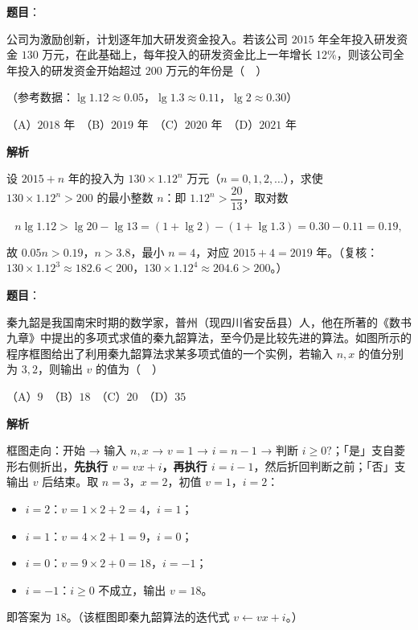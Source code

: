 \begin{answer}

\textbf{题目}：

公司为激励创新，计划逐年加大研发资金投入。若该公司 \(2015\) 年全年投入研发资金 \(130\) 万元，在此基础上，每年投入的研发资金比上一年增长 12\%，则该公司全年投入的研发资金开始超过 \(200\) 万元的年份是（　）

（参考数据：\(\lg 1.12\approx 0.05\)，\(\lg 1.3\approx 0.11\)，\(\lg 2\approx 0.30\)）

（A）\(2018\) 年　（B）\(2019\) 年　（C）\(2020\) 年　（D）\(2021\) 年

\textbf{解析}

设 \(2015+n\) 年的投入为 \(130\times1.12^{n}\) 万元（\(n=0,1,2,\dots\)），求使 \(130\times1.12^{n}>200\) 的最小整数 \(n\)：即 \(1.12^{n}>\dfrac{20}{13}\)，取对数

\nopagebreak[4]
\[
n\lg 1.12>\lg 20-\lg 13=(1+\lg 2)-(1+\lg 1.3)=0.30-0.11=0.19,
\]

故 \(0.05n>0.19\)，\(n>3.8\)，最小 \(n=4\)，对应 \(2015+4=2019\) 年。（复核：\(130\times1.12^{3}\approx182.6<200\)，\(130\times1.12^{4}\approx204.6>200\)。）


\end{answer}
\begin{answer}

\textbf{题目}：

秦九韶是我国南宋时期的数学家，普州（现四川省安岳县）人，他在所著的《数书九章》中提出的多项式求值的秦九韶算法，至今仍是比较先进的算法。如图所示的程序框图给出了利用秦九韶算法求某多项式值的一个实例，若输入 \(n,x\) 的值分别为 \(3,2\)，则输出 \(v\) 的值为（　）
\nopagebreak[4]
\begin{center}\end{center}
\nopagebreak[4]
（A）\(9\)　（B）\(18\)　（C）\(20\)　（D）\(35\)

\textbf{解析}

框图走向：开始 → 输入 \(n,x\) → \(v=1\) → \(i=n-1\) → 判断 \(i\geqslant0?\)；「是」支自菱形右侧折出，\textbf{先执行 \(v=vx+i\)，再执行 \(i=i-1\)}，然后折回判断之前；「否」支输出 \(v\) 后结束。取 \(n=3\)，\(x=2\)，初值 \(v=1\)，\(i=2\)：

\begin{itemize}
\item \(i=2\)：\(v=1\times2+2=4\)，\(i=1\)；
\item \(i=1\)：\(v=4\times2+1=9\)，\(i=0\)；
\item \(i=0\)：\(v=9\times2+0=18\)，\(i=-1\)；
\item \(i=-1\)：\(i\geqslant0\) 不成立，输出 \(v=18\)。
\end{itemize}

即答案为 \(18\)。（该框图即秦九韶算法的迭代式 \(v\leftarrow vx+i\)。）


\end{answer}
